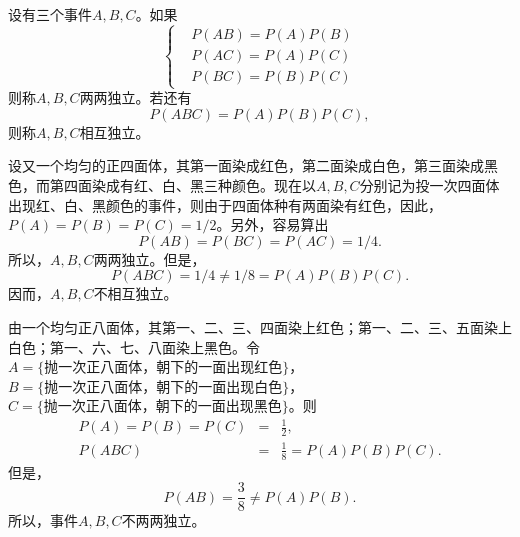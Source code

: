 \begin{definition}[两两独立性vs相互独立]
    设有三个事件$A,B,C$。如果
    \begin{equation}
        \left\{
        \begin{aligned}
       &    P(AB)=P(A)P(B)\\
       & P(AC)=P(A)P(C)\\
       & P(BC)=P(B)P(C)
        \end{aligned}
        \right.\label{eq: Lect2_pairwise_independence}
    \end{equation}
    则称$A,B,C$两两独立。若还有
    \begin{equation}
          P(ABC)=P(A)P(B)P(C),\label{eq: Lect2_triple_independence}
    \end{equation}
    则称$A,B,C$相互独立。
\end{definition}
\begin{remark}
 
\end{remark}
\begin{example}
        设又一个均匀的正四面体，其第一面染成红色，第二面染成白色，第三面染成黑色，而第四面染成有红、白、黑三种颜色。现在以$A,B,C$分别记为投一次四面体出现红、白、黑颜色的事件，则由于四面体种有两面染有红色，因此，$P(A)= P(B) = P(C) = 1/2$。另外，容易算出
        $$P(AB) = P(BC) = P(AC)=1/4.$$
        所以，$A,B,C$两两独立。但是，
        $$P(ABC) = 1/4 \neq 1/8 = P(A)P(B)P(C).$$
        因而，$A,B,C$不相互独立。
    \end{example}
    \begin{example}
    由一个均匀正八面体，其第一、二、三、四面染上红色；第一、二、三、五面染上白色；第一、六、七、八面染上黑色。令$A = \{\text{抛一次正八面体，朝下的一面出现红色}\}$，$B = \{\text{抛一次正八面体，朝下的一面出现白色}\}$，$C = \{\text{抛一次正八面体，朝下的一面出现黑色}\}$。则
    \begin{eqnarray*}
        P(A)=P(B) = P(C) &=& \frac{1}{2},\\
        P(ABC) &=& \frac{1}{8} = P(A) P(B)P(C).
    \end{eqnarray*}
    但是，
    $$P(AB) = \frac{3}{8} \neq P(A)P(B).$$
    所以，事件$A,B,C$不两两独立。
    \end{example}


